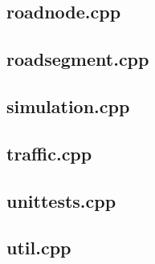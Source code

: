 \documentclass{article}
\begin{document}
  \subsection{roadnode.cpp}
    
  \subsection{roadsegment.cpp}
    
  \subsection{simulation.cpp}
    
  \subsection{traffic.cpp}
    
  \subsection{unittests.cpp}
    
  \subsection{util.cpp}
    
\end{document}
